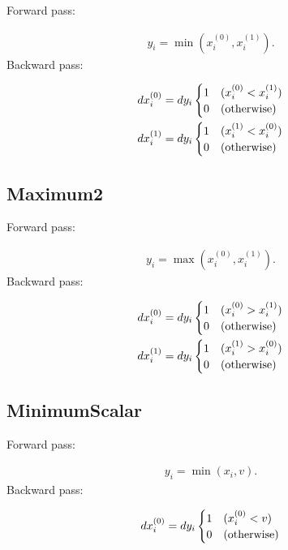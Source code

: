 \documentclass{article}
\begin{document}
Forward pass:

\begin{eqnarray}
  y_i = \min(x^{(0)}_i, x^{(1)}_i).
\end{eqnarray}
%
Backward pass:

\begin{eqnarray}
  dx^{(0)}_i = dy_i \begin{cases}
    1  & (x^{(0)}_i < x^{(1)}_i) \\
    0 & ({\rm otherwise})
  \end{cases}\\
  dx^{(1)}_i = dy_i \begin{cases}
    1  & (x^{(1)}_i < x^{(0)}_i) \\
    0 & ({\rm otherwise})
  \end{cases}
\end{eqnarray}

\subsection{Maximum2}

Forward pass:

\begin{eqnarray}
  y_i = \max(x^{(0)}_i, x^{(1)}_i).
\end{eqnarray}
%
Backward pass:

\begin{eqnarray}
  dx^{(0)}_i = dy_i \begin{cases}
    1  & (x^{(0)}_i > x^{(1)}_i) \\
    0 & ({\rm otherwise})
  \end{cases}\\
  dx^{(1)}_i = dy_i \begin{cases}
    1  & (x^{(1)}_i > x^{(0)}_i) \\
    0 & ({\rm otherwise})
  \end{cases}
\end{eqnarray}


\subsection{MinimumScalar}

Forward pass:

\begin{eqnarray}
  y_i = \min(x_i, v).
\end{eqnarray}
%
Backward pass:

\begin{eqnarray}
  dx^{(0)}_i = dy_i \begin{cases}
    1  & (x^{(0)}_i < v) \\
    0 & ({\rm otherwise})
  \end{cases}\\ 
\end{eqnarray}
\end{document}
